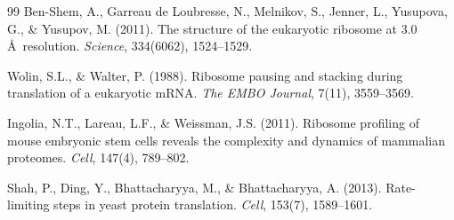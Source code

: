 \documentclass[11pt]{article}
\begin{document}
\begin{thebibliography}{99}
Ben-Shem, A., Garreau de Loubresse, N., Melnikov, S., Jenner, L., Yusupova, G., \& Yusupov, M. (2011).
The structure of the eukaryotic ribosome at 3.0 \AA\ resolution.
\textit{Science}, 334(6062), 1524--1529.

Wolin, S.L., \& Walter, P. (1988).
Ribosome pausing and stacking during translation of a eukaryotic mRNA.
\textit{The EMBO Journal}, 7(11), 3559--3569.

Ingolia, N.T., Lareau, L.F., \& Weissman, J.S. (2011).
Ribosome profiling of mouse embryonic stem cells reveals the complexity and dynamics of mammalian proteomes.
\textit{Cell}, 147(4), 789--802.

Shah, P., Ding, Y., Bhattacharyya, M., \& Bhattacharyya, A. (2013).
Rate-limiting steps in yeast protein translation.
\textit{Cell}, 153(7), 1589--1601.

\end{thebibliography}
\end{document}
